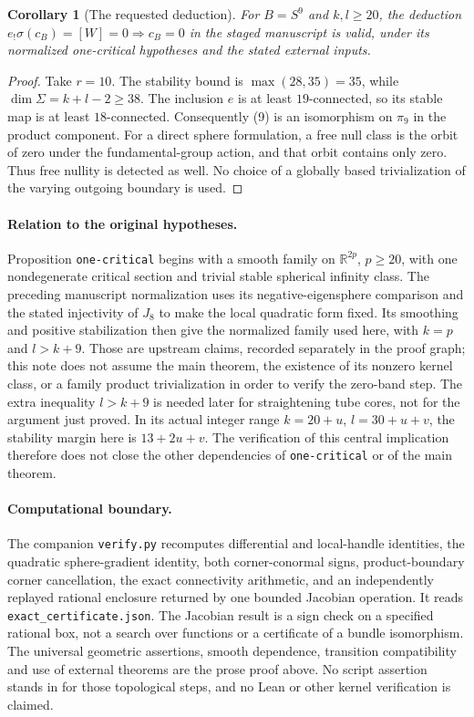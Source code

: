 \documentclass[11pt]{article}
\newtheorem{corollary}[theorem]{Corollary}
\newcommand{\R}{\mathbb R}
\begin{document}
\begin{corollary}[The requested deduction]
For $B=S^9$ and $k,l\geq20$, the deduction
$e_!\sigma(c_B)=[W]=0\Longrightarrow c_B=0$
in the staged manuscript is valid, under its normalized one-critical
hypotheses and the stated external inputs.
\end{corollary}
\begin{proof}
Take $r=10$. The stability bound is
$\max(28,35)=35$, while $\dim\Sigma=k+l-2\geq38$.
The inclusion $e$ is at least $19$-connected, so its stable map is
at least $18$-connected. Consequently (9) is an isomorphism on
$\pi_9$ in the product component.
For a direct sphere formulation, a free null class is the orbit of
zero under the fundamental-group action, and that orbit contains
only zero. Thus free nullity is detected as well. No choice of a
globally based trivialization of the varying outgoing boundary is used.
\end{proof}

\paragraph{Relation to the original hypotheses.}
Proposition \texttt{one-critical} begins with a smooth family on
$\R^{2p}$, $p\geq20$, with one nondegenerate critical section and
trivial stable spherical infinity class. The preceding manuscript
normalization uses its negative-eigensphere comparison and the stated
injectivity of $J_8$ to make the local quadratic form fixed.
Its smoothing and positive stabilization then give the normalized family
used here, with $k=p$ and $l>k+9$.
Those are upstream claims, recorded separately in the proof graph;
this note does not assume the main theorem, the existence of its
nonzero kernel class, or a family product trivialization in order to
verify the zero-band step.
The extra inequality $l>k+9$ is needed later for straightening tube
cores, not for the argument just proved. In its actual integer range
$k=20+u$, $l=30+u+v$, the stability margin here is $13+2u+v$.
The verification of this central implication therefore does not close
the other dependencies of \texttt{one-critical} or of the main theorem.

\paragraph{Computational boundary.}
The companion \texttt{verify.py} recomputes differential and local-handle
identities, the quadratic sphere-gradient identity, both corner-conormal
signs, product-boundary corner cancellation, the exact connectivity
arithmetic, and an independently replayed rational enclosure returned
by one bounded Jacobian operation. It reads \texttt{exact\_certificate.json}.
The Jacobian result is a sign check on a specified rational box, not a
search over functions or a certificate of a bundle isomorphism.
The universal geometric assertions, smooth dependence, transition
compatibility and use of external theorems are the prose proof above.
No script assertion stands in for those topological steps, and no Lean
or other kernel verification is claimed.
\end{document}

